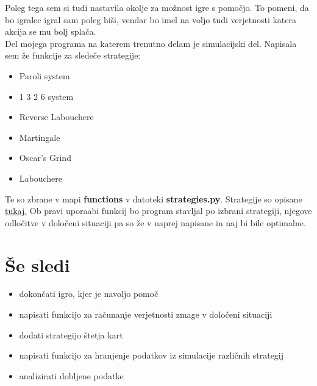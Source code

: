 \documentclass[a4paper, 16pt]{article}
\begin{document}
\noindent Poleg tega sem si tudi nastavila okolje za možnost igre s pomočjo. To pomeni, da bo igralec igral sam poleg hiši, vendar bo imel na voljo tudi verjetnosti katera akcija se mu bolj splača.\\

\noindent Del mojega programa na katerem trenutno delam je simulacijski del. Napisala sem že funkcije za sledeče strategije:
\begin{itemize}
\item Paroli system
\item 1 3 2 6 system
\item Reverse Labouchere
\item Martingale
\item Oscar’s Grind
\item Labouchere
\end{itemize}
Te so zbrane v mapi \textbf{functions} v datoteki \textbf{strategies.py}. Strategije so opisane \href{https://www.legitgamblingsites.com/blog/how-to-best-take-advantage-of-streaks-in-blackjack/}{tukaj.} Ob pravi uporaabi funkcij bo program stavljal po izbrani strategiji, njegove odločitve v določeni situaciji pa so že v naprej napisane in naj bi bile optimalne. 

 




\section{Še sledi}
\begin{itemize}
\item dokončati igro, kjer je navoljo pomoč
\item napisati funkcijo za računanje verjetnosti zmage v določeni situaciji
 \item dodati strategijo štetja kart
\item napisati funkcijo za hranjenje podatkov iz simulacije različnih strategij
\item analizirati dobljene podatke
\end{itemize}
\end{document}

